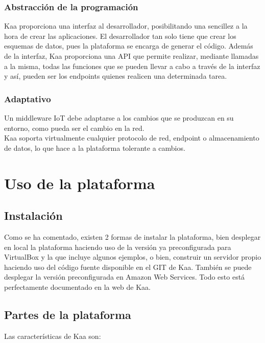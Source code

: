 \documentclass[12pt, twoside]{book}
\begin{document}
\subsubsection*{Abstracción de la programación}
Kaa proporciona una interfaz al desarrollador, posibilitando una sencillez a la hora de crear las aplicaciones. El desarrollador tan solo tiene que crear los esquemas de datos, pues la plataforma se encarga de generar el código. Además de la interfaz, Kaa proporciona una API que permite realizar, mediante llamadas a la misma, todas las funciones que se pueden llevar a cabo a través de la interfaz y así, pueden ser los endpoints quienes realicen una determinada tarea.

\subsubsection*{Adaptativo}
Un middleware IoT debe adaptarse a los cambios que se produzcan en su entorno, como pueda ser el cambio en la red.\\Kaa soporta virtualmente cualquier protocolo de red, endpoint o almacenamiento de datos, lo que hace a la plataforma tolerante a cambios.



\section{Uso de la plataforma}
\subsection{Instalación}
Como se ha comentado, existen 2 formas de instalar la plataforma, bien desplegar en local la plataforma haciendo uso de la versión ya preconfigurada para VirtualBox y la que incluye algunos ejemplos, o bien, construir un servidor propio haciendo uso del código fuente disponible en el GIT de Kaa. También se puede desplegar la versión preconfigurada en Amazon Web Services. Todo esto está perfectamente documentado en la web de Kaa.
\subsection{Partes de la plataforma}
Las características de Kaa son:
\end{document}
